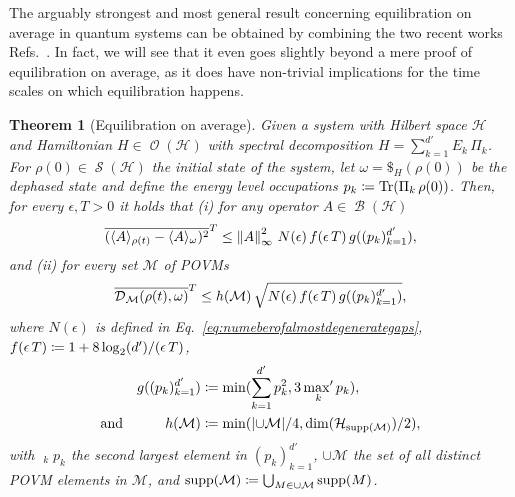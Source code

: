 \documentclass[a4paper,12pt,listof=totoc,index=totoc,bibliography=totoc,headsepline=false,headings=normal,BCOR16.153846mm,DIV12,headinclude,twoside,cleardoublepage=empty,numbers=noenddot,final]{scrreprt}
\theoremstyle{mystyle}
\numberwithin{equation}{section}
\numberwithin{figure}{section}
\numberwithin{lemma}{section}
\newtheorem{theorem}{Theorem}
\numberwithin{theorem}{section}
\numberwithin{corollary}{section}
\numberwithin{definition}{section}
\numberwithin{conjecture}{section}
\numberwithin{observation}{section}
\newcommand{\+}{\mkern2mu}
\newcommand{\coloneqq}{\mathrel{\vcentcolon\mkern-1.2mu=}} %
\newcommand{\union}{\cup}
\newcommand{\texteqref}[1]{Eq.~\eqref{#1}}
\renewcommand{\min}{\mathchoice{\operatorname*{min}}{\operatorname*{min}}{\mathrm{min}}{\mathrm{min}}}
\renewcommand{\H}{H}
\newcommand{\ex}[2]{\langle #1 \rangle_{#2}}
\newcommand{\norm}[2][]{
  \ifthenelse{\equal{#1}{}}
    {\left\| {#2} \right\|}
    {\ifthenelse{\equal{#1}{uinv}}
      {\left\vert\kern-0.25ex\left\vert\kern-0.25ex\left\vert {#2} \right\vert\kern-0.25ex\right\vert\kern-0.25ex\right\vert}
      {\left\| {#2} \right\|_{#1}}
    }
}
\newcommand{\taverage}[2][]{
  \ifthenelse{\equal{#1}{}}
  {\overline{#2}}
  {\overline{#2}^{#1}}
}
\newcommand{\tracedistance}[3][]{
  \ifthenelse{\equal{#2}{}}
  {\ifthenelse{\equal{#3}{}}
    {\mathcal{D}_{#1}}{}
  }{
    \ifthenelse{\equal{#1}{}}
    {\operatorname{\mathcal{D}}(#2,#3)}
    {\operatorname{\mathcal{D}}_{#1}(#2,#3)}
  }
}
\DeclareMathOperator*{\maxprime}{\mathrm{max}^\prime}
\DeclareMathOperator{\1}{\mathds{1}}
\newcommand{\POVMs}{\mathcal{M}}
\DeclareMathOperator{\Bop}{\mathcal{B}}
\DeclareMathOperator{\Obs}{\mathcal{O}}
\DeclareMathOperator{\Qst}{\mathcal{S}}
\DeclareMathOperator{\Tr}{Tr}
\DeclareMathOperator{\supp}{supp}
\newcommand{\mc}[1]{\mathcal{#1}}
\newcommand{\mcH}{\mc{H}}
\begin{document}
The arguably strongest and most general result concerning equilibration on average in quantum systems can be obtained by combining the two recent works Refs.~\cite{1110.5759v1,Reimann12}.
In fact, we will see that it even goes slightly beyond a mere proof of equilibration on average, as it does have non-trivial implications for the time scales on which equilibration happens.

\begin{theorem}[Equilibration on average] \label{thm:equilibrationonaverage}
  Given a system with Hilbert space $\mcH$ and Hamiltonian $\H \in \Obs(\mcH)$ with spectral decomposition $\H = \sum_{k=1}^{d'} E_k\,\Pi_k$.
  For $\rho(0) \in \Qst(\mcH)$ the initial state of the system, let $\omega = \$_H(\rho(0))$ be the dephased state and define the energy level occupations $p_k \coloneqq \Tr(\Pi_k\,\rho(0))$.
  Then, for every $\epsilon,T>0$ it holds that (i) for any operator $A \in \Bop(\mcH)$
  \begin{equation} \label{eq:equilibrationonaverageforexpectationvalues}
    \taverage[T]{( \ex A {\rho(t)} - \ex A \omega )^2} \leq \norm[\infty]{A}^2\,N(\epsilon)\,f(\epsilon\,T)\,g((p_k)_{k=1}^{d'})  ,
  \end{equation}
  and (ii) for every set $\POVMs$ of POVMs
  \begin{equation} \label{eq:equilibrationonaverageforrestricedpovms}
    \taverage[T]{\tracedistance[\POVMs]{\rho(t)}{\omega}} \leq h(\POVMs)\,\sqrt{N(\epsilon)\,f(\epsilon\,T)\,g((p_k)_{k=1}^{d'}) } ,
  \end{equation}
  where $N(\epsilon)$ is defined in \texteqref{eq:numeberofalmostdegenerategaps}, $f(\epsilon\,T) \coloneqq 1+8 \log_2(d')/(\epsilon\,T)$, 
  \begin{align}
    && g((p_k)_{k=1}^{d'}) &\coloneqq \min(\sum_{k=1}^{d'} p_k^2, 3  \maxprime_k p_k ) ,\label{eq:equilibrationonaveraggeneralizedeffectivedimenson}\\
    \text{and}&& h(\POVMs) &\coloneqq \min(|{\union \POVMs}|/4, \dim(\mcH_{\supp(\POVMs)})/2 ) \label{eq:equilibrationonaveragnumberofmeasurements},
  \end{align}
  with $\maxprime_k p_k$ the second largest element in $(p_k)_{k=1}^{d'}$, $\union \POVMs$ the set of all distinct POVM elements in $\POVMs$, and $\supp(\POVMs) \coloneqq \bigcup_{M \in \union \POVMs} \supp(M)$.
\end{theorem}
\end{document}
